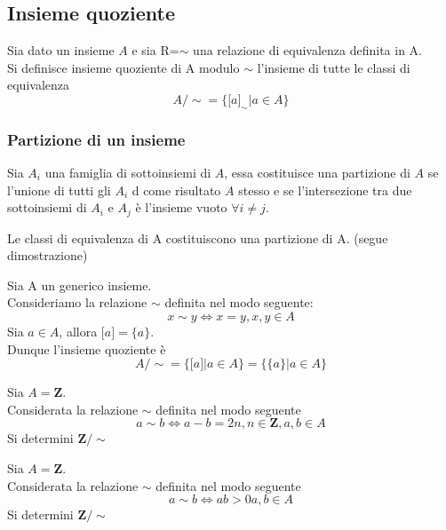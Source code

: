\begin{flushleft}
\subsection{Insieme quoziente}
Sia dato un insieme $A$ e sia R=$\sim$ una relazione di equivalenza definita in A.\\
Si definisce insieme quoziente di A modulo $\sim$ l'insieme di tutte le classi di equivalenza
\[A/\sim = \{\big[a\big]_{\sim} | a\in A\}\]



\subsubsection{Partizione di un insieme}
Sia $A_i$ una famiglia di sottoinsiemi di $A$, essa costituisce una partizione di $A$ se l'unione di tutti gli $A_i$ d come risultato $A$ stesso e se l'intersezione tra due sottoinsiemi di $A_i$ e $A_j$ è l'insieme vuoto $\forall i\neq j$.

\begin{proposizione}
Le classi di equivalenza di A costituiscono una partizione di A. (segue dimostrazione)
\end{proposizione}
\vspace{200px}


\begin{esempio}
Sia A un generico insieme.\\
Consideriamo la relazione $\sim$ definita nel modo seguente:
\[x\sim y \Leftrightarrow x = y, x,y \in A\]
Sia $a\in A$, allora $\big[a\big] = \{a\}$.\\
Dunque l'insieme quoziente è
\[A/\sim = \{\big[a\big] | a\in A\} = \{\{a\} | a\in A\}\]
\end{esempio}

\begin{esercizio}
Sia $A = \mathbf{Z}$.\\
Considerata la relazione $\sim$ definita nel modo seguente
\[a\sim b \Leftrightarrow a-b = 2n, n\in \mathbf{Z}, a,b \in A\]
Si determini $\mathbf{Z}/\sim$
\end{esercizio}
\vspace{200px}

\begin{esercizio}
Sia $A = \mathbf{Z}$.\\
Considerata la relazione $\sim$ definita nel modo seguente
\[a\sim b \Leftrightarrow ab >0 a,b \in A\]
Si determini $\mathbf{Z}/\sim$
\end{esercizio}
\vspace{200px}


\end{flushleft}
